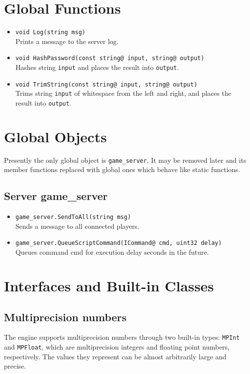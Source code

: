 \documentclass{book}
\begin{document}
\section{Global Functions}
\begin{itemize}
\item \texttt{void Log(string msg)}\\
  Prints a message to the server log.
\item \texttt{void HashPassword(const string@ input, string@ output)}\\
  Hashes string \texttt{input} and places the result into \texttt{output}.
\item \texttt{void TrimString(const string@ input, string@ output)}\\
  Trims string \texttt{input} of whitespace from the left and right, and places
  the result into \texttt{output}.
\end{itemize}

\section{Global Objects}
Presently the only global object is \texttt{game\_server}. It may be removed
later and its member functions replaced with global ones which behave like
static functions.

\subsection{Server game\_server}
\begin{itemize}
\item \texttt{game\_server.SendToAll(string msg)}\\
  Sends a message to all connected players.

\item \texttt{game\_server.QueueScriptCommand(ICommand@ cmd, uint32 delay)}\\
  Queues command cmd for execution delay seconds in the future.
\end{itemize}

\section{Interfaces and Built-in Classes}
\subsection{Multiprecision numbers}
The engine supports multiprecision numbers through two built-in types: \texttt{MPInt}
and \texttt{MPFloat}, which are multiprecision integers and floating point numbers,
respectively. The values they represent can be almost arbitrarily large and precise.
\end{document}
